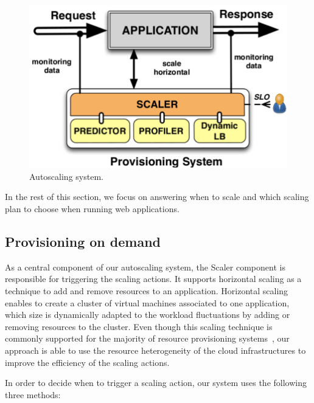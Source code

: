 \begin{figure}[htb]
  \begin{center}
    \includegraphics[width=.85\linewidth]{images/monitoringSchema}
  \end{center}
\vspace{-5mm}
  \caption{Autoscaling system.}
  \label{autoScalingSys}
\end{figure}

In the rest of this section, we focus on answering when to scale and which scaling plan to choose when running web applications.

\subsection{Provisioning on demand}
As a central component of our autoscaling system, the Scaler component is responsible for triggering the scaling actions. It supports horizontal scaling as a technique to add and remove resources to an application. Horizontal scaling enables to create a cluster of virtual machines associated to one application, which size is dynamically adapted to the workload fluctuations by adding or removing resources to the cluster. Even though this scaling technique is commonly supported for the majority of resource provisioning systems~\cite{ali-eldin_2012,bunch_2012,urgaonkar_agile_2008}, our approach is able to use the resource heterogeneity of the cloud infrastructures to improve the efficiency of the scaling actions.

In order to decide when to trigger a scaling action, our system uses the following three methods: 



